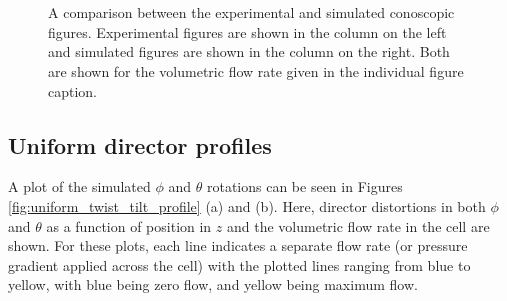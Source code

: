 \begin{figure}
\begin{center}
\\
\\
\end{center}
\caption[Comparison between experimental and simulated conoscopic figures (uniform state)]{\label{fig:87_model_data} A comparison between the experimental and simulated conoscopic figures. Experimental figures are shown in the column on the left and simulated figures are shown in the column on the right. Both are shown for the volumetric flow rate given in the individual figure caption.}
\end{figure}

\subsection{Uniform director profiles}
\label{sec:uniform_state_analysis}
A plot of the simulated $\phi$ and $\theta$ rotations can be seen in Figures \ref{fig:uniform_twist_tilt_profile} (a) and (b). Here, director distortions in both $\phi$ and $\theta$ as a function of position in $z$ and the volumetric flow rate in the cell are shown. For these plots, each line indicates a separate flow rate (or pressure gradient applied across the cell) with the plotted lines ranging from blue to yellow, with blue being zero flow, and yellow being maximum flow.

